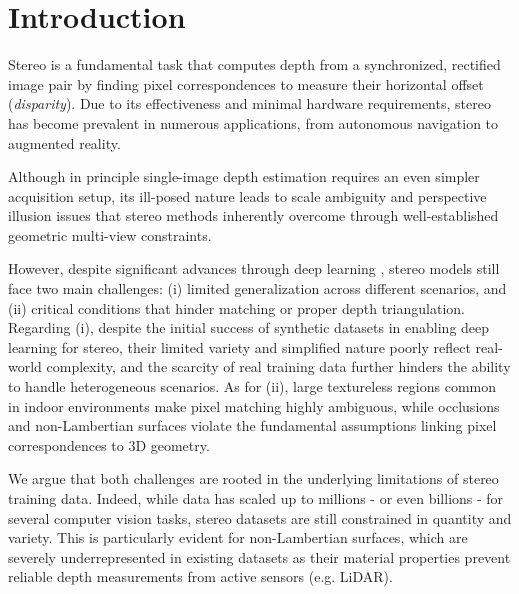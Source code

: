 \documentclass[10pt,twocolumn,letterpaper]{article}
\begin{document}
\phantom{Invisible Text}
\vspace{-\baselineskip}

\section{Introduction}

\label{sec:intro}

Stereo is a fundamental task that computes depth from a synchronized, rectified image pair by finding pixel correspondences to measure their horizontal offset (\textit{disparity}). Due to its effectiveness and minimal hardware requirements, stereo has become prevalent in numerous applications, from autonomous navigation to augmented reality.

Although in principle single-image depth estimation \cite{arampatzakis2023monocular} requires an even simpler acquisition setup, its ill-posed nature leads to scale ambiguity and perspective illusion issues that stereo methods inherently overcome through well-established geometric multi-view constraints.

However, despite significant advances through deep learning \cite{laga2020survey,poggi2021synergies}, stereo models still face two main challenges: (i) limited generalization across different scenarios, and (ii) critical conditions that hinder matching or proper depth triangulation.
Regarding (i), despite the initial success of synthetic datasets in enabling deep learning for stereo, their limited variety and simplified nature poorly reflect real-world complexity, and the scarcity of real training data further hinders the ability to handle heterogeneous scenarios. As for (ii), large textureless regions common in indoor environments make pixel matching highly ambiguous, while occlusions and non-Lambertian surfaces \cite{zamaramirez2022booster,zamaramirez2024booster,wen2024layeredflow} violate the fundamental assumptions linking pixel correspondences to 3D geometry.

We argue that both challenges are rooted in the underlying limitations of stereo training data. Indeed, while data has scaled up to millions - or even billions - for several computer vision tasks, stereo datasets are still constrained in quantity and variety.
This is particularly evident for non-Lambertian surfaces, which are severely underrepresented in existing datasets as their material properties prevent reliable depth measurements from active sensors (e.g. LiDAR).
\end{document}
